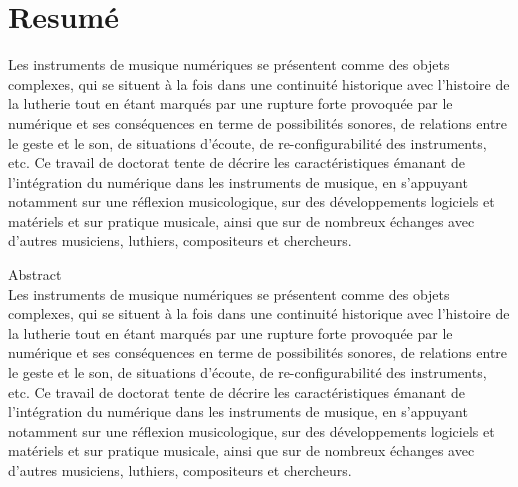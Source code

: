 %
\chapter*{Resumé}
\label{sec:abstract}
\vspace*{-10mm}

Les instruments de musique numériques se présentent comme des objets complexes, qui se situent à la fois dans une continuité historique avec l'histoire de la lutherie tout en étant marqués par une rupture forte provoquée par le numérique et ses conséquences en terme de possibilités sonores, de relations entre le geste et le son, de situations d'écoute, de re-configurabilité des instruments, etc. Ce travail de doctorat tente de décrire les caractéristiques émanant de l'intégration du numérique dans les instruments de musique, en s'appuyant notamment sur une réflexion musicologique, sur des développements logiciels et matériels et sur pratique musicale, ainsi que sur de nombreux échanges avec d'autres musiciens, luthiers, compositeurs et chercheurs.

\vspace*{20mm}

{Abstract}\label{sec:abstract-diff} \\

Les instruments de musique numériques se présentent comme des objets complexes, qui se situent à la fois dans une continuité historique avec l'histoire de la lutherie tout en étant marqués par une rupture forte provoquée par le numérique et ses conséquences en terme de possibilités sonores, de relations entre le geste et le son, de situations d'écoute, de re-configurabilité des instruments, etc. Ce travail de doctorat tente de décrire les caractéristiques émanant de l'intégration du numérique dans les instruments de musique, en s'appuyant notamment sur une réflexion musicologique, sur des développements logiciels et matériels et sur pratique musicale, ainsi que sur de nombreux échanges avec d'autres musiciens, luthiers, compositeurs et chercheurs.